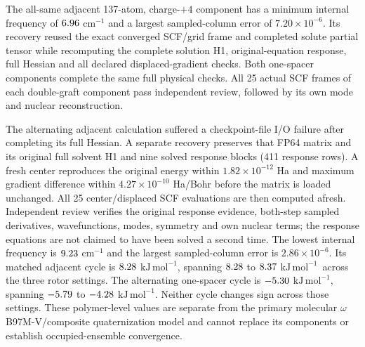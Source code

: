 \documentclass[11pt]{article}
\newcommand{\kj}{\ensuremath{\mathrm{kJ\,mol^{-1}}}}
\begin{document}
The all-same adjacent 137-atom, charge-$+4$ component has a minimum internal frequency of $6.96$ cm$^{-1}$ and a largest sampled-column error of $7.20\times10^{-6}$. Its recovery reused the exact converged SCF/grid frame and completed solute partial tensor while recomputing the complete solution H1, original-equation response, full Hessian and all declared displaced-gradient checks. Both one-spacer components complete the same full physical checks. All 25 actual SCF frames of each double-graft component pass independent review, followed by its own mode and nuclear reconstruction.

The alternating adjacent calculation suffered a checkpoint-file I/O failure after completing its full Hessian. A separate recovery preserves that FP64 matrix and its original full solvent H1 and nine solved response blocks (411 response rows). A fresh center reproduces the original energy within $1.82\times10^{-12}$ Ha and maximum gradient difference within $4.27\times10^{-10}$ Ha/Bohr before the matrix is loaded unchanged. All 25 center/displaced SCF evaluations are then computed afresh. Independent review verifies the original response evidence, both-step sampled derivatives, wavefunctions, modes, symmetry and own nuclear terms; the response equations are not claimed to have been solved a second time. The lowest internal frequency is $9.23$ cm$^{-1}$ and the largest sampled-column error is $2.86\times10^{-6}$. Its matched adjacent cycle is $8.28$ \kj, spanning $8.28$ to $8.37$ \kj\ across the three rotor settings. The alternating one-spacer cycle is $-5.30$ \kj, spanning $-5.79$ to $-4.28$ \kj. Neither cycle changes sign across those settings. These polymer-level values are separate from the primary molecular $\omega$B97M-V/composite quaternization model and cannot replace its components or establish occupied-ensemble convergence.

\begin{table}[htbp]\centering\small
\caption{Matched components of all four checked ionic viologen neighboring-graft cycles. Charges and multiplicities are global assignments. Frequencies are cm$^{-1}$; FD error is the largest sampled-column relative error in percent. Each graph retains one local minimum.}
\label{tab:ionic-native-cycle}

\end{table}
\end{document}
